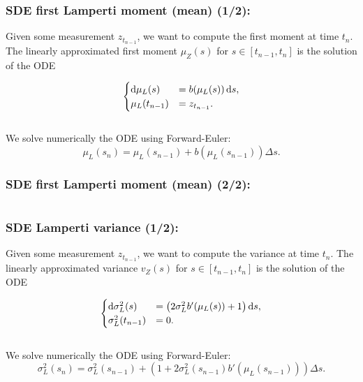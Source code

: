 \documentclass[aspectratio=169]{beamer}\usepackage[utf8]{inputenc}
\begin{document}

\begin{frame}\frametitle{SDE first Lamperti moment (mean) (1/2):}
Given some measurement $z_{t_{n-1}}$, we want to compute the first moment at time $t_n$. The linearly approximated first moment $\mu_Z(s)$ for $s\in[t_{n-1},t_n]$ is the solution of the ODE

\begin{equation*}
\begin{cases}
\dif \mu_L(s)&=b(\mu_L(s))\dif s,\\
\mu_L(t_{n-1})&=z_{t_{n-1}}.
\end{cases}
\end{equation*}
\quad\\
We solve numerically the ODE using Forward-Euler:
\begin{equation*}
\mu_L(s_{n})=\mu_L(s_{n-1})+b(\mu_L(s_{n-1}))\Delta s.
\end{equation*}

\end{frame}


\begin{frame}\frametitle{SDE first Lamperti moment (mean) (2/2):}

\begin{center}
\begin{tabular}{|c|}
\toprule
{\scriptsize

}\\
\bottomrule
\end{tabular}
\end{center}

\end{frame}


\begin{frame}\frametitle{SDE Lamperti variance (1/2):}
Given some measurement $z_{t_{n-1}}$, we want to compute the variance at time $t_n$. The linearly approximated variance $v_Z(s)$ for $s\in[t_{n-1},t_n]$ is the solution of the ODE

\begin{equation*}
\begin{cases}
\dif \sigma^2_L(s)&=\left(2\sigma^2_Lb'(\mu_L(s))+1\right)\dif s,\\
\sigma^2_L(t_{n-1})&=0.
\end{cases}
\end{equation*}
\quad\\
We solve numerically the ODE using Forward-Euler:
\begin{equation*}
\sigma^2_L(s_{n})=\sigma^2_L(s_{n-1})+\left(1+2\sigma^2_L(s_{n-1})b'(\mu_L(s_{n-1}))\right)\Delta s.
\end{equation*}

\end{frame}
\end{document}
